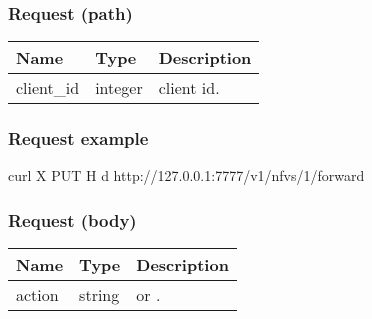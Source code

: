 \documentclass[a4paper,11pt,openany,oneside,english]{sphinxmanual}
\begin{document}
\subsubsection{Request (path)}
\label{\detokenize{api_ref/spp_nfv:id1}}

\begin{savenotes}\sphinxattablestart
\centering
{}
\sphinxthecaptionisattop
{}\label{\detokenize{api_ref/spp_nfv:id26}}\label{\detokenize{api_ref/spp_nfv:table-spp-ctl-spp-nfv-forward-get}}
\sphinxaftertopcaption
\begin{tabulary}{\linewidth}[t]{|T|T|T|}
\hline
\sphinxstyletheadfamily 
Name
&\sphinxstyletheadfamily 
Type
&\sphinxstyletheadfamily 
Description
\\
\hline
client\_id
&
integer
&
client id.
\\
\hline
\end{tabulary}
\par
\sphinxattableend\end{savenotes}


\subsubsection{Request example}
\label{\detokenize{api_ref/spp_nfv:id2}}
\begin{sphinxVerbatim}[commandchars=\\\{\},formatcom=\footnotesize]
 curl \PYGZhy{}X PUT \PYGZhy{}H  
  \PYGZhy{}d  
  http://127.0.0.1:7777/v1/nfvs/1/forward
\end{sphinxVerbatim}


\subsubsection{Request (body)}
\label{\detokenize{api_ref/spp_nfv:request-body}}

\begin{savenotes}\sphinxattablestart
\centering
{}
\sphinxthecaptionisattop
{}\label{\detokenize{api_ref/spp_nfv:id27}}\label{\detokenize{api_ref/spp_nfv:table-spp-ctl-spp-nfv-forward-get-body}}
\sphinxaftertopcaption
\begin{tabulary}{\linewidth}[t]{|T|T|T|}
\hline
\sphinxstyletheadfamily 
Name
&\sphinxstyletheadfamily 
Type
&\sphinxstyletheadfamily 
Description
\\
\hline
action
&
string
&
 or .
\\
\hline
\end{tabulary}
\par
\sphinxattableend\end{savenotes}
\end{document}
